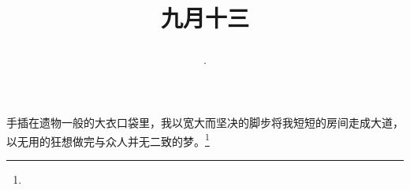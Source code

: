 \title{\date[d=15,m=10,y=2024][year:cn-y,年,month:cn,day:cn,日,·,weekday]·九月十三 }
手插在遗物一般的大衣口袋里，我以宽大而坚决的脚步将我短短的房间走成大道，以无用的狂想做完与众人并无二致的梦。\footnote{ }

